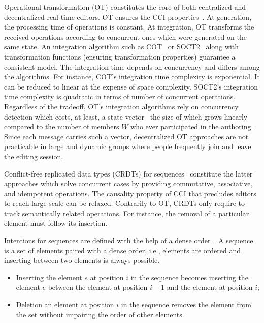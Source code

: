 Operational transformation (OT) constitutes the core of both centralized and
decentralized real-time editors. OT ensures the CCI
properties~\cite{sun1998achieving}. At generation, the processing time of
operations is constant. At integration, OT transforms the received operations
according to concurrent ones which were generated on the same state. An
integration algorithm such as COT~\cite{sun2009contextbased} or
SOCT2~\cite{vidot2000copies} along with transformation functions (ensuring
transformation properties) guarantee a consistent model. The integration time
depends on concurrency and differs among the algorithms.  For instance, COT's
integration time complexity is exponential. It can be reduced to linear at the
expense of space complexity. SOCT2's integration time complexity is quadratic in
terms of number of concurrent operations.  Regardless of the tradeoff, OT's
integration algorithms rely on concurrency detection which costs, at least, a
state vector~\cite{charronbost1991concerning} the size of which grows linearly
compared to the number of members $W$ who ever participated in the
authoring. Since each message carries such a vector, decentralized OT approaches
are not practicable in large and dynamic groups where people frequently join and
leave the editing session.

Conflict-free replicated data types (CRDTs) for
sequences~\cite{shapiro2011comprehensive, shapiro2011conflict} constitute the
latter approaches which solve concurrent cases by providing commutative,
associative, and idempotent operations.  The causality property of CCI that
precludes editors to reach large scale can be relaxed. Contrarily to OT, CRDTs
only require to track semantically related operations. For instance, the removal
of a particular element must follow its insertion.

Intentions for sequences are defined with the help of a dense
order~\cite{weiss2010logootundo}.
A sequence is a set of elements paired with a dense order, i.e., elements are
ordered and inserting between two elements is always possible.
\begin{itemize}
\item Inserting the element $e$ at position $i$ in the sequence becomes
  inserting the element $e$ between the element at position $i-1$ and the
  element at position $i$;
\item Deletion an element at position $i$ in the sequence removes the element
  from the set without impairing the order of other elements.
\end{itemize}


